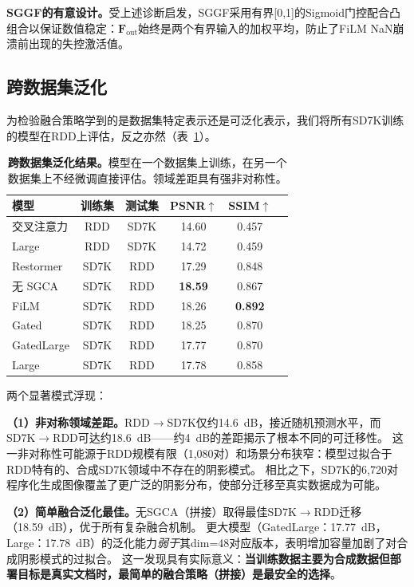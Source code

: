 \documentclass[11pt]{ctexart}
\begin{document}
\textbf{SGGF的有意设计。}受上述诊断启发，SGGF采用有界[0,1]的Sigmoid门控配合凸组合以保证数值稳定：$\mathbf{F}_{\text{out}}$始终是两个有界输入的加权平均，防止了FiLM NaN崩溃前出现的失控激活值。

\subsection{跨数据集泛化}
\label{sec:cross_dataset}

为检验融合策略学到的是数据集特定表示还是可泛化表示，我们将所有SD7K训练的模型在RDD上评估，反之亦然（表~\ref{tab:cross_dataset}）。

\begin{table}[t]
\centering
\caption{\textbf{跨数据集泛化结果。}模型在一个数据集上训练，在另一个数据集上不经微调直接评估。领域差距具有强非对称性。}
\label{tab:cross_dataset}
\begin{tabular}{@{}lccccc@{}}
\toprule
\textbf{模型} & \textbf{训练集} & \textbf{测试集} & \textbf{PSNR$\uparrow$} & \textbf{SSIM$\uparrow$} \\
\midrule
交叉注意力  & RDD & SD7K & 14.60 & 0.457 \\
Large      & RDD & SD7K & 14.72 & 0.459 \\
\midrule
Restormer   & SD7K & RDD & 17.29 & 0.848 \\
无 SGCA     & SD7K & RDD & \textbf{18.59} & 0.867 \\
FiLM        & SD7K & RDD & 18.26 & \textbf{0.892} \\
Gated       & SD7K & RDD & 18.25 & 0.870 \\
GatedLarge  & SD7K & RDD & 17.77 & 0.870 \\
Large       & SD7K & RDD & 17.78 & 0.858 \\
\bottomrule
\end{tabular}
\end{table}

两个显著模式浮现：

\textbf{（1）非对称领域差距。}RDD$\rightarrow$SD7K仅约14.6~dB，接近随机预测水平，而SD7K$\rightarrow$RDD可达约18.6~dB——约4~dB的差距揭示了根本不同的可迁移性。
这一非对称性可能源于RDD规模有限（1,080对）和场景分布狭窄：模型过拟合于RDD特有的、合成SD7K领域中不存在的阴影模式。
相比之下，SD7K的6,720对程序化生成图像覆盖了更广泛的阴影分布，使部分迁移至真实数据成为可能。

\textbf{（2）简单融合泛化最佳。}无SGCA（拼接）取得最佳SD7K$\rightarrow$RDD迁移（18.59~dB），优于所有复杂融合机制。
更大模型（GatedLarge：17.77~dB，Large：17.78~dB）的泛化能力\textit{弱于}其dim=48对应版本，表明增加容量加剧了对合成阴影模式的过拟合。
这一发现具有实际意义：\textbf{当训练数据主要为合成数据但部署目标是真实文档时，最简单的融合策略（拼接）是最安全的选择}。
\end{document}

